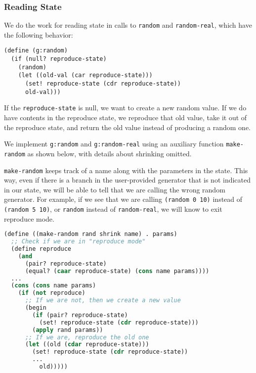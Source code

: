 \subsubsection{Reading State}

We do the work for reading state in calls to \verb|random| and \verb|random-real|, which have the following behavior:
\begin{lstlisting}
(define (g:random)
  (if (null? reproduce-state)
    (random)
    (let ((old-val (car reproduce-state)))
      (set! reproduce-state (cdr reproduce-state))
      old-val)))
\end{lstlisting}

If the \verb|reproduce-state| is null, we want to create a new random value. If we do have contents in the reproduce state, we reproduce that old value, take it out of the reproduce state, and return the old value instead of producing a random one.

We implement \verb|g:random| and \verb|g:random-real| using an auxiliary function \verb|make-random| as shown below, with details about shrinking omitted.


\verb|make-random| keeps track of a name along with the parameters in the state. This way, even if there is a branch in the user-provided generator that is not indicated in our state, we will be able to tell that we are calling the wrong random generator. For example, if we see that we are calling \verb|(random 0 10)| instead of \verb|(random 5 10)|, or \verb|random| instead of \verb|random-real|, we will know to exit reproduce mode.

\begin{lstlisting}[language=lisp]
(define ((make-random rand shrink name) . params)
  ;; Check if we are in "reproduce mode"
  (define reproduce
    (and
      (pair? reproduce-state)
      (equal? (caar reproduce-state) (cons name params))))
  ...
  (cons (cons name params)
    (if (not reproduce)
      ;; If we are not, then we create a new value
      (begin
        (if (pair? reproduce-state)
          (set! reproduce-state (cdr reproduce-state)))
        (apply rand params))
      ;; If we are, reproduce the old one
      (let ((old (cdar reproduce-state)))
        (set! reproduce-state (cdr reproduce-state))
        ...
          old)))))
\end{lstlisting}

